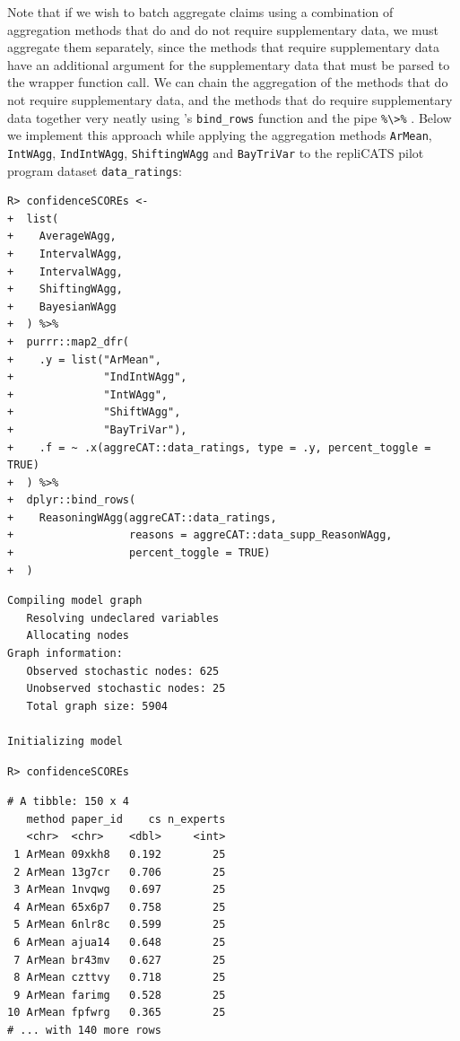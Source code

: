 \documentclass[article]{jss}
\newcommand{\fct}[1]{\code{#1()}}
\begin{document}
Note that if we wish to batch aggregate claims using a combination of
aggregation methods that do and do not require supplementary data, we
must aggregate them separately, since the methods that require
supplementary data have an additional argument for the supplementary
data that must be parsed to the wrapper function call. We can chain the
aggregation of the methods that do not require supplementary data, and
the methods that do require supplementary data together very neatly
using 's \texttt{bind\_rows} function \citep{dplyr2021} and
the \fct{magrittr} pipe \texttt{\%\textbackslash{}\textgreater{}\%}
\citep{magrittr2020}. Below we implement this approach while applying
the aggregation methods \texttt{ArMean}, \texttt{IntWAgg},
\texttt{IndIntWAgg}, \texttt{ShiftingWAgg} and \texttt{BayTriVar} to the
repliCATS pilot program dataset \texttt{data\_ratings}:

\begin{verbatim}
R> confidenceSCOREs <-
+  list(
+    AverageWAgg,
+    IntervalWAgg,
+    IntervalWAgg,
+    ShiftingWAgg,
+    BayesianWAgg
+  ) %>%
+  purrr::map2_dfr(
+    .y = list("ArMean", 
+              "IndIntWAgg", 
+              "IntWAgg", 
+              "ShiftWAgg", 
+              "BayTriVar"),
+    .f = ~ .x(aggreCAT::data_ratings, type = .y, percent_toggle = TRUE)
+  ) %>% 
+  dplyr::bind_rows(
+    ReasoningWAgg(aggreCAT::data_ratings, 
+                  reasons = aggreCAT::data_supp_ReasonWAgg, 
+                  percent_toggle = TRUE)
+  )
\end{verbatim}

\begin{verbatim}
Compiling model graph
   Resolving undeclared variables
   Allocating nodes
Graph information:
   Observed stochastic nodes: 625
   Unobserved stochastic nodes: 25
   Total graph size: 5904

Initializing model
\end{verbatim}

\begin{verbatim}
R> confidenceSCOREs
\end{verbatim}

\begin{verbatim}
# A tibble: 150 x 4
   method paper_id    cs n_experts
   <chr>  <chr>    <dbl>     <int>
 1 ArMean 09xkh8   0.192        25
 2 ArMean 13g7cr   0.706        25
 3 ArMean 1nvqwg   0.697        25
 4 ArMean 65x6p7   0.758        25
 5 ArMean 6nlr8c   0.599        25
 6 ArMean ajua14   0.648        25
 7 ArMean br43mv   0.627        25
 8 ArMean czttvy   0.718        25
 9 ArMean farimg   0.528        25
10 ArMean fpfwrg   0.365        25
# ... with 140 more rows
\end{verbatim}
\end{document}
